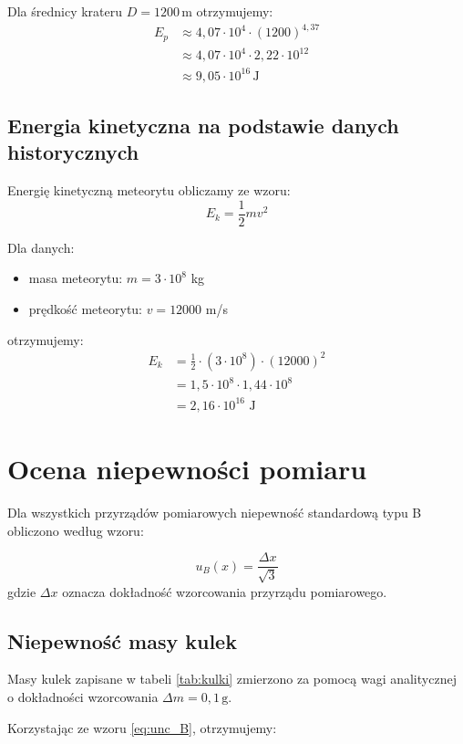 \documentclass[a4paper,12pt]{article}
\begin{document}
Dla średnicy krateru \( D = 1200 \, \text{m} \) otrzymujemy:
\begin{align*}
E_p &\approx 4,07 \cdot 10^4 \cdot (1200)^{4,37} \\
&\approx 4,07 \cdot 10^4 \cdot 2,22 \cdot 10^{12} \\
&\approx 9,05 \cdot 10^{16} \, \text{J}
\end{align*}

\subsection{Energia kinetyczna na podstawie danych historycznych}

Energię kinetyczną meteorytu obliczamy ze wzoru:
\[
E_k = \frac{1}{2} m v^2
\]

Dla danych:
\begin{itemize}
    \item masa meteorytu: \( m = 3 \cdot 10^8 \) kg
    \item prędkość meteorytu: \( v = 12000 \) m/s
\end{itemize}

otrzymujemy:
\begin{align*}
E_k &= \frac{1}{2} \cdot (3 \cdot 10^8) \cdot (12000)^2 \\
&= 1,5 \cdot 10^8 \cdot 1,44 \cdot 10^8 \\
&= 2,16 \cdot 10^{16} \text{ J}
\end{align*}

\section{Ocena niepewności pomiaru}

Dla wszystkich przyrządów pomiarowych niepewność standardową typu B obliczono według wzoru:

\begin{equation}
    \label{eq:unc_B}
    u_B(x) = \frac{\Delta x}{\sqrt{3}}
\end{equation}
gdzie $\Delta x$ oznacza dokładność wzorcowania przyrządu pomiarowego.

\subsection{Niepewność masy kulek}
Masy kulek zapisane w tabeli \ref{tab:kulki} zmierzono za pomocą wagi analitycznej o dokładności wzorcowania $\Delta m = 0,1 \, \text{g}$. 

Korzystając ze wzoru \eqref{eq:unc_B}, otrzymujemy:
\end{document}
